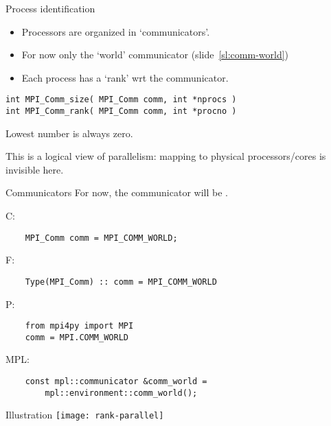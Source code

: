 \begin{numberedframe}{Process identification}
  \label{sl:comm-world}
  \begin{itemize}
  \item Processors are organized in `communicators'.
  \item For now only the `world' communicator
    (slide~\ref{sl:comm-world})
  \item Each process has a `rank' wrt the communicator.
  \end{itemize}

\lstset{language=C}
\begin{lstlisting}
int MPI_Comm_size( MPI_Comm comm, int *nprocs )
int MPI_Comm_rank( MPI_Comm comm, int *procno )
\end{lstlisting}
Lowest number is always zero.

This is a logical view of parallelism: mapping to physical
processors/cores is invisible here.
\end{numberedframe}

\begin{numberedframe}{Communicators}
  \label{sl:mpi-comm-world}
  For now, the communicator will be .

  C:
  \lstset{language=C}
  \begin{lstlisting}
    MPI_Comm comm = MPI_COMM_WORLD;
  \end{lstlisting}

  F:
  \lstset{language=Fortran}
  \begin{lstlisting}
    Type(MPI_Comm) :: comm = MPI_COMM_WORLD
  \end{lstlisting}

  P:
  \lstset{language=Python}
  \begin{lstlisting}
    from mpi4py import MPI
    comm = MPI.COMM_WORLD
  \end{lstlisting}

  MPL:
  \lstset{language=C++}
  \begin{lstlisting}
    const mpl::communicator &comm_world =
        mpl::environment::comm_world();
  \end{lstlisting}
\end{numberedframe}

\begin{numberedframe}{Illustration}
  \texttt{[image: rank-parallel]}
\end{numberedframe}


